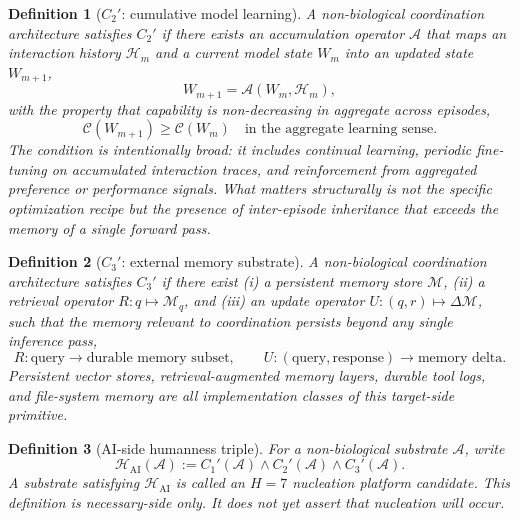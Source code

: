\documentclass[11pt]{article}
\newtheorem{definition}{Definition}
\begin{document}
\begin{definition}[$C_2'$: cumulative model learning]
\label{def:C2prime}
A non-biological coordination architecture satisfies
$C_2'$
if there exists an accumulation operator
$\mathcal{A}$
that maps an interaction history
$\mathcal{H}_m$
and a current model state
$W_m$
into an updated state
$W_{m+1}$,
\begin{equation}
W_{m+1}=\mathcal{A}(W_m,\mathcal{H}_m),
\label{eq:S-AIsubstrate-C2prime-update}
\end{equation}
with the property that capability is non-decreasing in aggregate across
episodes,
\begin{equation}
\mathcal{C}(W_{m+1})\ge \mathcal{C}(W_m)
\quad\text{in the aggregate learning sense.}
\label{eq:S-AIsubstrate-C2prime}
\end{equation}
The condition is intentionally broad:
it includes continual learning,
periodic fine-tuning on accumulated interaction traces,
and reinforcement from aggregated preference or performance signals.
What matters structurally is not the specific optimization recipe but the
presence of inter-episode inheritance that exceeds the memory of a single
forward pass.
\end{definition}

\begin{definition}[$C_3'$: external memory substrate]
\label{def:C3prime}
A non-biological coordination architecture satisfies
$C_3'$
if there exist
(i) a persistent memory store
$\mathcal{M}$,
(ii) a retrieval operator
$R: q\mapsto \mathcal{M}_q$,
and
(iii) an update operator
$U:(q,r)\mapsto \Delta \mathcal{M}$,
such that the memory relevant to coordination persists beyond any single
inference pass,
\begin{equation}
R: \text{query} \longrightarrow \text{durable memory subset},
\qquad
U: (\text{query},\text{response}) \longrightarrow \text{memory delta}.
\label{eq:S-AIsubstrate-C3prime}
\end{equation}
Persistent vector stores,
retrieval-augmented memory layers,
durable tool logs,
and file-system memory are all implementation classes of this target-side
primitive.
\end{definition}

\begin{definition}[AI-side humanness triple]
\label{def:AItriple}
For a non-biological substrate
$\mathcal{A}$,
write
\begin{equation}
\mathcal{H}_{\mathrm{AI}}(\mathcal{A})
:=
C_1'(\mathcal{A})\wedge C_2'(\mathcal{A})\wedge C_3'(\mathcal{A}).
\label{eq:S-AIsubstrate-AItriple}
\end{equation}
A substrate satisfying
$\mathcal{H}_{\mathrm{AI}}$
is called an
\emph{$H{=}7$ nucleation platform candidate}.
This definition is necessary-side only.
It does not yet assert that nucleation will occur.
\end{definition}
\end{document}
